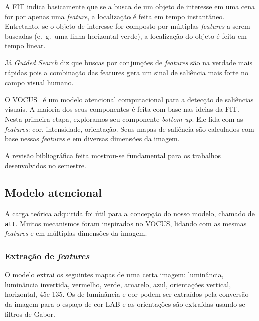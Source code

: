 \documentclass[article]{IEEEtran}
\newcommand{\tit}[1]{\textit{#1}}
\newcommand{\ttt}[1]{\texttt{#1}}
\newcommand{\eg}{e.~g.~}
\begin{document}
A FIT indica basicamente que se a busca de um objeto de interesse em uma
cena for por apenas uma \tit{feature}, a localização é feita em tempo
instantâneo.
Entretanto, se o objeto de interesse for composto por múltiplas \tit{features}
a serem buscadas (\eg uma linha horizontal verde),
a localização do objeto é feita em tempo linear.

Já \tit{Guided Search} diz que buscas por conjunções de \tit{features} são na
verdade mais rápidas pois a combinação das features gera um sinal de
saliência mais forte no campo visual humano.

O VOCUS~\cite{Frintrop2006} é um modelo atencional computacional
para a detecção de saliências visuais.
A maioria dos seus componentes é feita com base nas ideias da FIT\@.
Nesta primeira etapa, exploramos seu componente \tit{bottom-up}.
Ele lida com as \tit{features}: cor, intensidade, orientação.
Seus mapas de saliência são calculados com base nessas \tit{features}
e em diversas dimensões da imagem.

A revisão bibliográfica feita mostrou-se fundamental para os trabalhos
desenvolvidos no semestre.

\subsection{Modelo atencional}
A carga teórica adquirida foi útil para a concepção do nosso modelo,
chamado de \ttt{att}.
Muitos mecanismos foram inspirados no VOCUS, lidando com as mesmas
\tit{features} e em múltiplas dimensões da imagem.

\subsubsection{Extração de \tit{features}}
O modelo extrai os seguintes mapas de uma certa imagem:
luminância, luminância invertida, vermelho, verde, amarelo, azul,
orientações vertical, horizontal, 45\degree e 135\degree.
Os de luminância e cor podem ser extraídos pela conversão da imagem para o
espaço de cor LAB e as orientações são extraídas usando-se filtros de Gabor.
\end{document}
